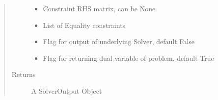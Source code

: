 \documentclass[letterpaper,10pt,english]{sphinxmanual}
\begin{document}
\begin{fulllineitems}
\begin{quote}
\begin{description}
\begin{itemize}
\item {} 
\sphinxAtStartPar
{} \textendash{} Constraint RHS matrix, can be None

\item {} 
\sphinxAtStartPar
{} \textendash{} List of Equality constraints

\item {} 
\sphinxAtStartPar
{} \textendash{} Flag for output of underlying Solver, default False

\item {} 
\sphinxAtStartPar
{} \textendash{} Flag for returning dual variable of problem, default True

\end{itemize}

\item[{Returns}] \leavevmode
\sphinxAtStartPar
A SolverOutput Object

\end{description}\end{quote}

\end{fulllineitems}

\end{document}
